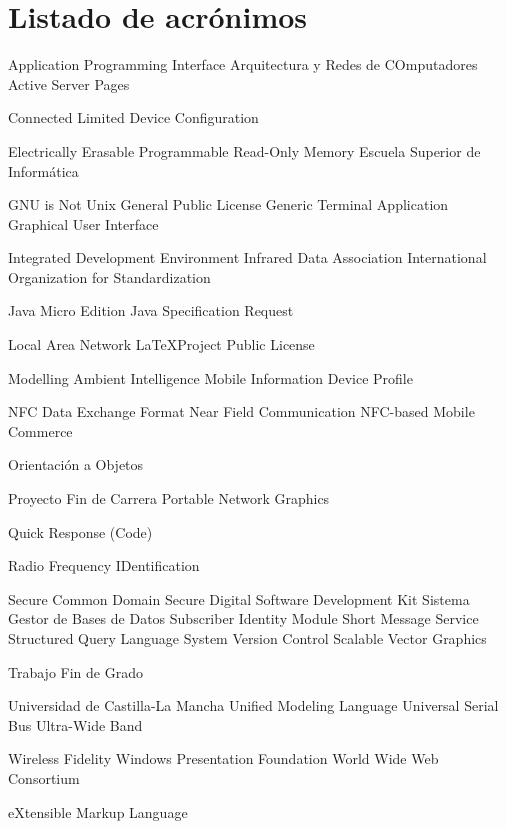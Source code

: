 
\chapter{Listado de acrónimos}

{\small
\begin{acronym}[XXXXXXXX]
       {Application Programming Interface}
      {Arquitectura y Redes de COmputadores}
       {Active Server Pages}

      {Connected Limited Device Configuration}

    {Electrically Erasable Programmable Read-Only Memory}
       {Escuela Superior de Informática}

       {GNU is Not Unix}
       {General Public License}
       {Generic Terminal Application}
       {Graphical User Interface}

       {Integrated Development Environment}
      {Infrared Data Association}
       {International Organization for Standardization}

    {Java Micro Edition}
       {Java Specification Request}

       {Local Area Network}
      {\LaTeX Project Public License}

      {Modelling Ambient Intelligence}
      {Mobile Information Device Profile}

      {NFC Data Exchange Format}
       {Near Field Communication}
       {NFC-based Mobile Commerce}

        {Orientación a Objetos}

       {Proyecto Fin de Carrera}
       {Portable Network Graphics}
  
        {Quick Response (Code)}

      {Radio Frequency IDentification}

       {Secure Common Domain}
        {Secure Digital}
       {Software Development Kit}
      {Sistema Gestor de Bases de Datos}
       {Subscriber Identity Module}
       {Short Message Service}
       {Structured Query Language}
       {System Version Control}
       {Scalable Vector Graphics}

       {Trabajo Fin de Grado}

      {Universidad de Castilla-La Mancha}
       {Unified Modeling Language}
       {Universal Serial Bus}
       {Ultra-Wide Band}

      {Wireless Fidelity}
       {Windows Presentation Foundation}
       {World Wide Web Consortium}

       {eXtensible Markup Language}
\end{acronym}
}



